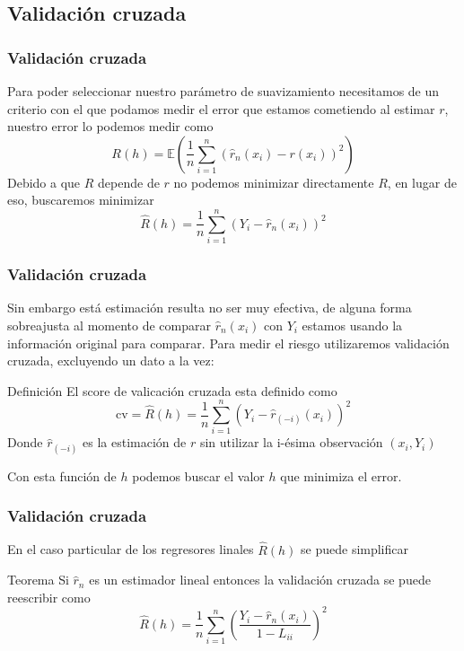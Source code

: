 \documentclass[aspectratio=169,spanish]{beamer}
\begin{document}
\begin{frame}
\section{Validación cruzada}
\frametitle{Validación cruzada}
Para poder seleccionar nuestro parámetro de suavizamiento necesitamos de un criterio con el que podamos medir el error que estamos cometiendo al estimar $r$, nuestro error lo podemos medir como $$R(h)=\mathbb{E}\left(\frac{1}{n}\sum_{i=1}^{n}(\hat{r}_n(x_i)-r(x_i))^2\right)$$
Debido a que $R$ depende de $r$ no podemos minimizar directamente $R$, en lugar de eso, buscaremos minimizar $$\hat{R}(h)=\frac{1}{n}\sum_{i=1}^{n}(Y_i-\hat{r}_n(x_i))^2$$
\end{frame}



\begin{frame}
\frametitle{Validación cruzada}
Sin embargo está estimación resulta no ser muy efectiva, de alguna forma sobreajusta al momento de comparar $\hat{r}_n(x_i)$ con $Y_i$ estamos usando la información original para comparar. Para medir el riesgo utilizaremos validación cruzada, excluyendo un dato a la vez:
\begin{block}{Definición}
El score de valicación cruzada esta definido como 
$$\text{cv} = \hat{R}(h) = \frac{1}{n}\sum_{i=1}^{n}(Y_i-\hat{r}_{(-i)}(x_i))^2$$
Donde $\hat{r}_{(-i)}$ es la estimación de $r$ sin utilizar la i-ésima observación $(x_i,Y_i)$
\end{block}
Con esta función de $h$ podemos buscar el valor $h$ que minimiza el error.
\end{frame}



\begin{frame}
\frametitle{Validación cruzada}
En el caso particular de los regresores linales $\hat{R}(h)$ se puede simplificar
\begin{block}{Teorema}
Si $\hat{r}_n$ es un estimador lineal entonces la validación cruzada se puede reescribir como 
$$\hat{R}(h)=\frac{1}{n}\sum_{i=1}^{n}\left(\frac{Y_i-\hat{r}_n(x_i)}{1-L_{ii}}\right)^2$$
\end{block}
\end{frame}
\end{document}
